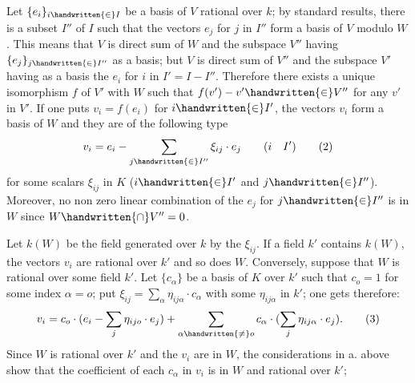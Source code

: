 Let $\{e_i\}_{i\handwritten{\in}I}$ be a basis of $V$ rational over $k$; by standard results, there is a subset $I''$ of $I$ such that the vectors $e_j$ for $j$ in $I''$ form a basis of $V$ modulo $W$. This means that $V$ is direct sum of $W$ and the subspace $V''$ having $\{e_j\}_{j\handwritten{\in}I''}$ as a basis; but $V$ is direct sum of $V''$ and the subspace $V'$ having as a basis the $e_i$ for $i$ in $I'=I-I''$. Therefore there exists a unique isomorphism $f$ of $V'$ with $W$ such that $f(v')-v'\handwritten{\in}V''$ for any $v'$ in $V'$. If one puts $v_i=f(e_i)$ for $i\handwritten{\in}I'$, the vectors $v_i$ form a basis of $W$ and they are of the following type
\[
v_i=e_i-\sum_{j\handwritten{\in}I''}\xi_{ij}\cdot e_j\qquad(i\quad I')
\tag*{(2)}
\]
for some scalars $\xi_{ij}$ in $K$ ($i\handwritten{\in}I'$ and $j\handwritten{\in}I''$). Moreover, no non zero linear combination of the $e_j$ for $j\handwritten{\in}I''$ is in $W$ since $W\handwritten{\cap}V''=0$.

Let $k(W)$ be the field generated over $k$ by the $\xi_{ij}$. If a field $k'$ contains $k(W)$, the vectors $v_i$ are rational over $k'$ and so does $W$. Conversely, suppose that $W$ is rational over some field $k'$. Let $\{c_\alpha\}$ be a basis of $K$ over $k'$ such that $c_o=1$ for some index $\alpha=o$; put $\xi_{ij}=\sum\limits_\alpha\eta_{ij\alpha}\cdot c_\alpha$ with some $\eta_{ij\alpha}$ in $k'$; one gets therefore:
\[
v_i=c_o\cdot(e_i-\sum_j\eta_{ijo}\cdot e_j)+\sum_{\alpha\handwritten{\ne}o}c_\alpha\cdot(\sum_j\eta_{ij\alpha}\cdot e_j).
\tag*{(3)}
\]
Since $W$ is rational over $k'$ and the $v_i$ are in $W$, the considerations in a. above show that the coefficient of each $c_\alpha$ in $v_i$ is in $W$ and rational over $k'$;
